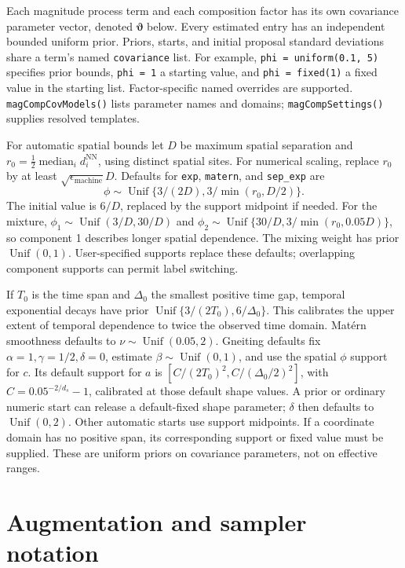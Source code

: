 \documentclass[11pt]{article}
\newcommand{\Unif}{\operatorname{Unif}}
\begin{document}
Each magnitude process term and each composition factor has its own covariance
parameter vector, denoted \(\boldsymbol\vartheta\) below. Every estimated
entry has an independent bounded uniform prior. Priors, starts, and initial
proposal standard deviations share a term's named \texttt{covariance} list.
For example, \texttt{phi = uniform(0.1, 5)} specifies prior bounds,
\texttt{phi = 1} a starting value, and \texttt{phi = fixed(1)} a fixed value
in the starting list. Factor-specific named overrides are supported.
\texttt{magCompCovModels()} lists parameter names and domains;
\texttt{magCompSettings()} supplies resolved templates.

For automatic spatial bounds let \(D\) be maximum spatial separation and
\(r_0=\tfrac12\operatorname{median}_i d_i^{\mathrm{NN}}\), using distinct
spatial sites. For numerical scaling, replace \(r_0\) by at least
\(\sqrt{\epsilon_{\mathrm{machine}}}D\). Defaults for \texttt{exp},
\texttt{matern}, and \texttt{sep\_exp} are
\begin{equation}
 \phi\sim\Unif\{3/(2D),3/\min(r_0,D/2)\}.
 \label{eq:default-range-support}
\end{equation}
The initial value is \(6/D\), replaced by the support midpoint if needed.
For the mixture, \(\phi_1\sim\Unif(3/D,30/D)\) and
\(\phi_2\sim\Unif\{30/D,3/\min(r_0,0.05D)\}\), so component 1 describes
longer spatial dependence. The mixing weight has prior \(\Unif(0,1)\).
User-specified supports replace these defaults; overlapping component supports
can permit label switching.

If \(T_0\) is the time span and \(\Delta_0\) the smallest positive time gap,
temporal exponential decays have prior
\(\Unif\{3/(2T_0),6/\Delta_0\}\). This calibrates the upper extent of temporal
dependence to twice the observed time domain. Mat\'ern smoothness defaults to
\(\nu\sim\Unif(0.05,2)\). Gneiting defaults fix
\(\alpha=1,\gamma=1/2,\delta=0\), estimate \(\beta\sim\Unif(0,1)\), and use
the spatial \(\phi\) support for \(c\). Its default support for \(a\) is
\([C/(2T_0)^2,C/(\Delta_0/2)^2]\), with \(C=0.05^{-2/d_s}-1\), calibrated
at those default shape values. A prior or ordinary numeric start can release
a default-fixed shape parameter; \(\delta\) then defaults to \(\Unif(0,2)\).
Other automatic starts use support midpoints. If a coordinate domain has no
positive span, its corresponding support or fixed value must be supplied.
These are uniform priors on covariance parameters, not on effective ranges.

\section{Augmentation and sampler notation}
\label{sec:augmentation}
\end{document}
